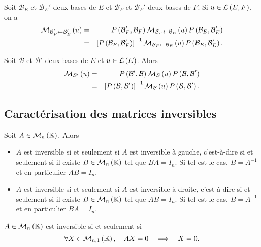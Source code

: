 \documentclass{magnolia}
\begin{document}
\begin{proposition}[utile=-3]
Soit $\mathcal{B}_E$ et $\mathcal{B}_E'$ deux bases de $E$ et $\mathcal{B}_F$ et
$\mathcal{B}_F'$ deux bases de $F$. Si $u\in\mathcal{L}\left(E,F\right)$, on a
\begin{eqnarray*}
\mathcal{M}_{\mathcal{B}_F'\gets\mathcal{B}_E'}\left(u\right)
&=& P\left(\mathcal{B}_F',\mathcal{B}_F\right)\mathcal{M}_{\mathcal{B}_F\gets\mathcal{B}_E}\left(u\right)
    P\left(\mathcal{B}_E ,\mathcal{B}_E'\right)\\
&=& \left[P\left(\mathcal{B}_F,\mathcal{B}_F'\right)\right]^{-1}
    \mathcal{M}_{\mathcal{B}_F\gets\mathcal{B}_E}\left(u\right)
    P\left(\mathcal{B}_E ,\mathcal{B}_E'\right).
\end{eqnarray*}
\end{proposition}

\begin{proposition}[utile=-3]
Soit $\mathcal{B}$ et $\mathcal{B}'$ deux bases de $E$ et $u\in\mathcal{L}\left(E\right)$. Alors
\begin{eqnarray*}
\mathcal{M}_{\mathcal{B}'}\left(u\right)
&=& P\left(\mathcal{B}',\mathcal{B}\right)\mathcal{M}_{\mathcal{B}}\left(u\right)
    P\left(\mathcal{B},\mathcal{B}'\right)\\
&=& \left[P\left(\mathcal{B},\mathcal{B}'\right)\right]^{-1}\mathcal{M}_{\mathcal{B}}\left(u\right)
    P\left(\mathcal{B},\mathcal{B}'\right).
\end{eqnarray*}
\end{proposition}

\subsection{Caractérisation des matrices inversibles}

\begin{proposition}[utile=3]
Soit $A\in\mathcal{M}_{n}\left(\mathbb{K}\right)$. Alors
\begin{itemize}
\item $A$ est inversible si et seulement si $A$ est inversible à gauche,
  c'est-à-dire si et seulement si il existe $B\in\mathcal{M}_{n}\left(\mathbb{K}\right)$ tel que $BA=I_n$.
  Si tel est le cas, $B=A^{-1}$ et en particulier $AB=I_n$.
\item $A$ est inversible si et seulement si $A$ est inversible à droite,
  c'est-à-dire si et seulement si il existe $B\in\mathcal{M}_{n}\left(\mathbb{K}\right)$ tel que $AB=I_n$.
  Si tel est le cas, $B=A^{-1}$ et en particulier $BA=I_n$.
\end{itemize}
\end{proposition}

\begin{proposition}[utile=3]
$A\in\mathcal{M}_{n}\left(\mathbb{K}\right)$ est inversible si et seulement si
\[\forall X\in\mathcal{M}_{n,1}\left(\mathbb{K}\right) ,\quad AX=0 \quad\Longrightarrow\quad X=0.\]
\end{proposition}
\end{document}
